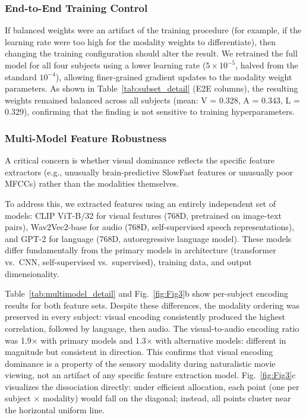 \documentclass[conference]{IEEEtran}
\begin{document}
\subsubsection{End-to-End Training Control}
If balanced weights were an artifact of the training procedure (for example, if the learning rate were too high for the modality weights to differentiate), then changing the training configuration should alter the result. We retrained the full model for all four subjects using a lower learning rate ($5 \times 10^{-5}$, halved from the standard $10^{-4}$), allowing finer-grained gradient updates to the modality weight parameters. As shown in Table~\ref{tab:subset_detail} (E2E columns), the resulting weights remained balanced across all subjects (mean: V = 0.328, A = 0.343, L = 0.329), confirming that the finding is not sensitive to training hyperparameters.


\subsubsection{Multi-Model Feature Robustness}\label{sec:multimodel}
A critical concern is whether visual dominance reflects the specific feature extractors (e.g., unusually brain-predictive SlowFast features or unusually poor MFCCs) rather than the modalities themselves.

To address this, we extracted features using an entirely independent set of models: CLIP ViT-B/32 \cite{radford2021learning} for visual features (768D, pretrained on image-text pairs), Wav2Vec2-base \cite{baevski2020wav2vec} for audio (768D, self-supervised speech representations), and GPT-2 \cite{radford2019language} for language (768D, autoregressive language model). These models differ fundamentally from the primary models in architecture (transformer vs.\ CNN, self-supervised vs.\ supervised), training data, and output dimensionality.

Table~\ref{tab:multimodel_detail} and Fig.~\ref{fig:Fig3}b show per-subject encoding results for both feature sets. Despite these differences, the modality ordering was preserved in every subject: visual encoding consistently produced the highest correlation, followed by language, then audio. The visual-to-audio encoding ratio was 1.9$\times$ with primary models and 1.3$\times$ with alternative models: different in magnitude but consistent in direction. This confirms that visual encoding dominance is a property of the sensory modality during naturalistic movie viewing, not an artifact of any specific feature extraction model. Fig.~\ref{fig:Fig3}c visualizes the dissociation directly: under efficient allocation, each point (one per subject $\times$ modality) would fall on the diagonal; instead, all points cluster near the horizontal uniform line.
\end{document}
